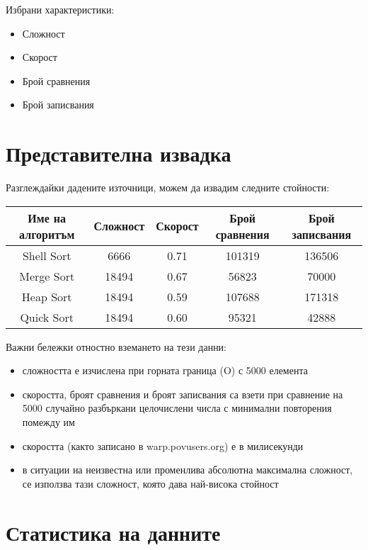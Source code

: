 \documentclass[12pt,a4paper]{article}
\begin{document}
Избрани характеристики:

\begin{itemize}
\item Сложност
\item Скорост
\item Брой сравнения
\item Брой записвания
\end{itemize}

\newpage

\section{Представителна извадка}

Разглеждайки дадените източници, можем да извадим следните стойности:
\begin{center}
\begin{tabular}{|c|c c c c|}
	\hline
	Име на алгоритъм & Сложност & Скорост & Брой сравнения & Брой записвания \\[3pt]
	\hline\hline
	Shell Sort & 6666 & 0.71 & 101319 & 136506 \\[3pt]
	Merge Sort & 18494 & 0.67 & 56823 & 70000 \\[3pt]
	Heap Sort & 18494 & 0.59 & 107688 & 171318 \\[3pt]
	Quick Sort & 18494 & 0.60 & 95321 & 42888 \\[3pt]
	\hline
\end{tabular}
\end{center}

Важни бележки отностно вземането на тези данни: 
\begin{itemize}
\item сложността е изчислена при горната граница (O) с 5000 елемента
\item скоростта, броят сравнения и броят записвания са взети при сравнение на 5000 случайно разбъркани целочислени числа с минимални повторения помежду им\cite{comparing_algorithms}
\item скоростта (както записано в warp.povusers.org\cite{comparing_algorithms}) е в милисекунди
\item в ситуации на неизвестна или променлива абсолютна максимална сложност, се използва тази сложност, която дава най-висока стойност
\end{itemize}

\section{Статистика на данните}
\end{document}
